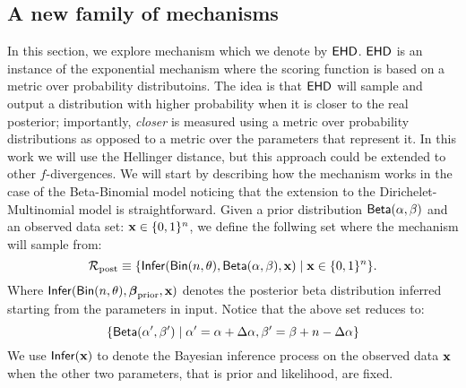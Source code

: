 \documentclass{article}
\begin{document}
\subsection{A new family of mechanisms}
In this section, we explore  mechanism which we denote by $\mathsf{EHD}$. $\mathsf{EHD}$ is an instance
of the exponential mechanism \cite{??} where the scoring function is based on a metric over
probability distributoins.
The idea is that $\mathsf{EHD}$ will sample and output a distribution with higher probability when
it is closer to the real posterior; importantly,  \emph{closer} is measured using a metric over probability
distributions as opposed to a metric over the parameters that represent it. In this work we will
use the Hellinger distance, but this approach could be extended to other $f$-divergences. We will
start by describing how the mechanism works in the case of the Beta-Binomial model noticing that
the extension to the Dirichelet-Multinomial model is straightforward.
Given a prior distribution $\mathsf{Beta}(\alpha, \beta)$ and an observed data set: $\textbf{x}\in\{0,1\}^n$,
we define the follwing set  where the mechanism will sample from:
\[
  \mathcal{R}_{\textup{post}}\equiv\{\mathsf{Infer}(\mathsf{Bin}(n, \theta), \mathsf{Beta}(\alpha, \beta),\textbf{x})\mid \textbf{x} \in \{0,1\}^n\}.
\]
Where $\mathsf{Infer}(\mathsf{Bin}(n, \theta), \boldsymbol{\beta}_{\textup{prior}},\textbf{x})$ denotes the posterior beta distribution inferred starting from the parameters in input.
Notice that the above set reduces to:
\[
  \{\mathsf{Beta}(\alpha',\beta')\mid \alpha'=\alpha + \Delta\alpha, \beta'=\beta + n-\Delta\alpha\}
\]
We use $\mathsf{Infer}(\textbf{x})$ to denote the Bayesian inference process on the observed data $\textbf{x}$
when the other two parameters, that is prior and likelihood, are fixed. 
\end{document}
